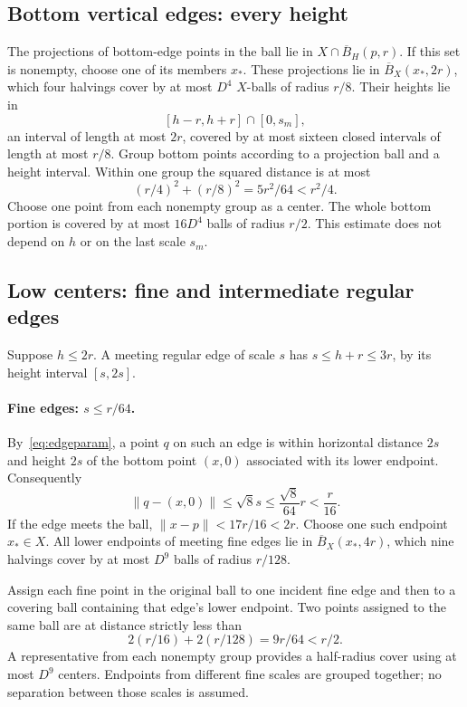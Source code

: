 \documentclass[11pt,a4paper]{article}
\theoremstyle{definition}
\theoremstyle{remark}
\numberwithin{equation}{section}
\newcommand{\norm}[1]{\lVert #1\rVert}
\newcommand{\cB}{\overline B}
\begin{document}
\subsection{Bottom vertical edges: every height}
The projections of bottom-edge points in the ball lie in $X\cap\cB_H(p,r)$. If this set is nonempty, choose one of its members $x_*$. These projections lie in $\cB_X(x_*,2r)$, which four halvings cover by at most $D^4$ $X$-balls of radius $r/8$. Their heights lie in
\[
 [h-r,h+r]\cap[0,s_m],
\]
an interval of length at most $2r$, covered by at most sixteen closed intervals of length at most $r/8$. Group bottom points according to a projection ball and a height interval. Within one group the squared distance is at most
\begin{equation}\label{eq:bottom}
 (r/4)^2+(r/8)^2=5r^2/64<r^2/4.
\end{equation}
Choose one point from each nonempty group as a center. The whole bottom portion is covered by at most $16D^4$ balls of radius $r/2$. This estimate does not depend on $h$ or on the last scale $s_m$.

\subsection{Low centers: fine and intermediate regular edges}
Suppose $h\le2r$. A meeting regular edge of scale $s$ has $s\le h+r\le3r$, by its height interval $[s,2s]$.

\paragraph{Fine edges: $s\le r/64$.}
By~\eqref{eq:edgeparam}, a point $q$ on such an edge is within horizontal distance $2s$ and height $2s$ of the bottom point $(x,0)$ associated with its lower endpoint. Consequently
\begin{equation}\label{eq:fineclose}
 \norm{q-(x,0)}\le\sqrt8s\le\frac{\sqrt8}{64}r<\frac r{16}.
\end{equation}
If the edge meets the ball, $\norm{x-p}<17r/16<2r$. Choose one such endpoint $x_*\in X$. All lower endpoints of meeting fine edges lie in $\cB_X(x_*,4r)$, which nine halvings cover by at most $D^9$ balls of radius $r/128$.

Assign each fine point in the original ball to one incident fine edge and then to a covering ball containing that edge's lower endpoint. Two points assigned to the same ball are at distance strictly less than
\begin{equation}\label{eq:finegroup}
 2(r/16)+2(r/128)=9r/64<r/2.
\end{equation}
A representative from each nonempty group provides a half-radius cover using at most $D^9$ centers. Endpoints from different fine scales are grouped together; no separation between those scales is assumed.
\end{document}
